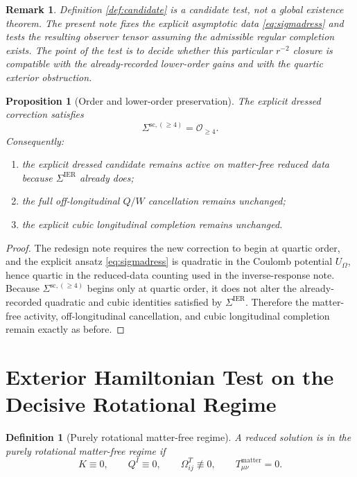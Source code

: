 \documentclass[11pt]{article}
\newcommand{\SigmaIER}{\Sigma^{\mathrm{IER}}}
\newcommand{\SigmaSRFourSC}{\Sigma^{\mathrm{sc},(\ge 4)}}
\newtheorem{definition}{Definition}
\newtheorem{proposition}{Proposition}
\newtheorem{remark}{Remark}
\begin{document}
\begin{remark}
Definition \ref{def:candidate} is a candidate test, not a global existence theorem. The present note fixes the explicit asymptotic data \eqref{eq:sigmadress} and tests the resulting observer tensor assuming the admissible regular completion exists. The point of the test is to decide whether this particular \(r^{-2}\) closure is compatible with the already-recorded lower-order gains and with the quartic exterior obstruction.
\end{remark}

\begin{proposition}[Order and lower-order preservation]
\label{prop:orders}
The explicit dressed correction satisfies
\begin{equation}
\SigmaSRFourSC=\mathcal O_{\ge 4}.
\label{eq:quarticorder}
\end{equation}
Consequently:
\begin{enumerate}
    \item the explicit dressed candidate remains active on matter-free reduced data because \(\SigmaIER\) already does;
    \item the full off-longitudinal \(Q/W\) cancellation remains unchanged;
    \item the explicit cubic longitudinal completion remains unchanged.
\end{enumerate}
\end{proposition}

\begin{proof}
The redesign note requires the new correction to begin at quartic order, and the explicit ansatz \eqref{eq:sigmadress} is quadratic in the Coulomb potential \(U_\Omega\), hence quartic in the reduced-data counting used in the inverse-response note. Because \(\SigmaSRFourSC\) begins only at quartic order, it does not alter the already-recorded quadratic and cubic identities satisfied by \(\SigmaIER\). Therefore the matter-free activity, off-longitudinal cancellation, and cubic longitudinal completion remain exactly as before.
\end{proof}

\section{Exterior Hamiltonian Test on the Decisive Rotational Regime}

\begin{definition}[Purely rotational matter-free regime]
\label{def:rot}
A reduced solution is in the \emph{purely rotational matter-free regime} if
\begin{equation}
K\equiv0,
\qquad
Q^I\equiv0,
\qquad
\Omega_{ij}^T\not\equiv0,
\qquad
T_{\mu\nu}^{\mathrm{matter}}=0.
\label{eq:rot}
\end{equation}
\end{definition}
\end{document}
